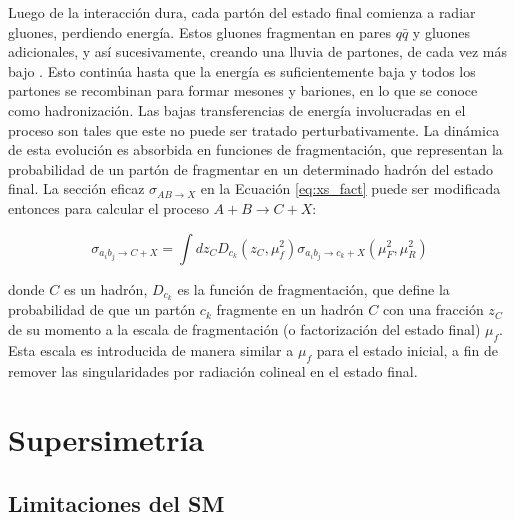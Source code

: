 Luego de la interacción dura, cada partón del estado final comienza a radiar gluones,
perdiendo energía. Estos gluones fragmentan en pares $q\bar{q}$ y gluones adicionales, y así sucesivamente, creando una lluvia de partones, de cada vez más bajo \pt. Esto continúa hasta
que la energía es suficientemente baja y todos los partones se recombinan para formar
mesones y bariones, en lo que se conoce como hadronización. Las bajas transferencias de
energía involucradas en el proceso son tales que este no puede ser tratado perturbativamente. La dinámica de esta evolución es absorbida en funciones de fragmentación, que
representan la probabilidad de un partón de fragmentar en un determinado hadrón del
estado final. La sección eficaz $\sigma_{AB\to X}$ en la Ecuación \ref{eq:xs_fact} puede ser modificada entonces para
calcular el proceso $A + B \to C + X$:

\begin{equation}
	\sigma_{a_i b_j \to C+X} = \int dz_{C} D_{c_k}(z_C, \mu_{f}^2) \sigma_{a_i b_j \to c_k + X}(\mu_{F}^2, \mu_{R}^2)
\end{equation}

donde $C$ es un hadrón, $D_{c_k}$ es la función de fragmentación, que define la probabilidad
de que un partón $c_k$ fragmente en un hadrón $C$ con una fracción $z_C$ de su momento a la
escala de fragmentación (o factorización del estado final) $\mu_{f}$. Esta escala es introducida
de manera similar a $\mu_{f}$ para el estado inicial, a fin de remover las singularidades por
radiación colineal en el estado final.














\section{Supersimetría}

\subsection{Limitaciones del SM}